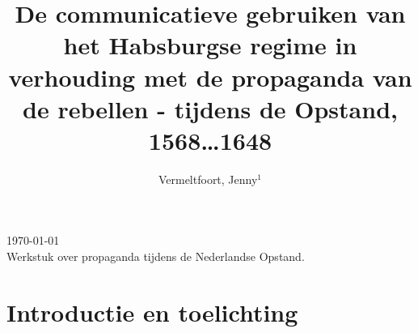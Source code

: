 \documentclass[12pt]{amsart}
\theoremstyle{definition}
\theoremstyle{remark}
\numberwithin{equation}{section}
\begin{document}
\setcounter{page}{1}

\hfill     {\small \today} \\
{\small Werkstuk over propaganda tijdens de Nederlandse Opstand.}\hfill
{\small } %

\centerline{}

\centerline{}

\title[Short Title]{De communicatieve gebruiken van het Habsburgse regime in
     verhouding met de propaganda van de rebellen - tijdens de Opstand,
     1568\ldots1648}

\author[J. Vermeltfoort]{Vermeltfoort, Jenny$^1$}

\address{$^{1}$ 3787494, Student Faculteit Geesteswetenschappen, Leiden
     Universiteit, Leiden, Nederland.}
\email{\textcolor[rgb]{0.00,0.00,0.84}{j.vermeltfoort@umail.leidenuniv.nl}}


\begin{abstract}
\end{abstract} \maketitle

\section{Introductie en toelichting}

% 


\end{document}
